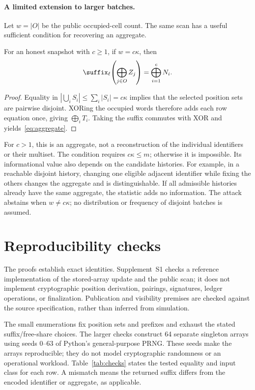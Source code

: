 \paragraph{A limited extension to larger batches.}
Let $w=|O|$ be the public occupied-cell count. The same scan has a useful
sufficient condition for recovering an aggregate.

\begin{proposition}
\label{prop:disjoint}
For an honest snapshot with $c\geq1$, if $w=c\kappa$, then
\begin{equation}
 \suffix_\ell\!\left(\bigoplus_{j\in O}Z_j\right)
       =\bigoplus_{i=1}^{c}N_i.
 \label{eq:aggregate}
\end{equation}
\end{proposition}

\begin{proof}
Equality in
$|\bigcup_i S_i|\leq\sum_i|S_i|=c\kappa$ implies that the selected position
sets are pairwise disjoint. XORing the occupied words therefore adds each
row equation once, giving $\bigoplus_i T_i$. Taking the suffix commutes
with XOR and yields~\eqref{eq:aggregate}.
\end{proof}

For $c>1$, this is an aggregate, not a reconstruction of the individual
identifiers or their multiset. The condition requires $c\kappa\leq m$;
otherwise it is impossible. Its informational value also depends on the
candidate histories. For example, in a reachable disjoint history, changing
one eligible adjacent identifier while fixing the others changes the aggregate
and is distinguishable. If all admissible histories already have the same
aggregate, the statistic adds no information. The attack abstains when
$w\ne c\kappa$; no distribution or frequency of disjoint batches is assumed.

\section{Reproducibility checks}

The proofs establish exact identities. Supplement~S1 checks a reference
implementation of the stored-array update and the public scan; it does not
implement cryptographic position derivation, pairings, signatures, ledger
operations, or finalization. Publication and visibility premises are checked
against the source specification, rather than inferred from simulation.

The small enumerations fix position sets and prefixes and exhaust the stated
suffix/free-share choices. The larger checks construct 64 separate singleton
arrays using seeds $0$--$63$ of Python's general-purpose PRNG. These seeds
make the arrays reproducible; they do not model cryptographic randomness or
an operational workload. Table~\ref{tab:checks} states the tested equality
and input class for each row. A mismatch means the returned suffix differs
from the encoded identifier or aggregate, as applicable.

